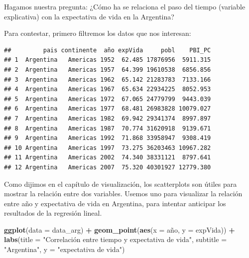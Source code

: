 \documentclass[spanish,]{book}
\newenvironment{Shaded}{\begin{snugshade}}{\end{snugshade}}
\newcommand{\DataTypeTok}[1]{\textcolor[rgb]{0.13,0.29,0.53}{#1}}
\newcommand{\KeywordTok}[1]{\textcolor[rgb]{0.13,0.29,0.53}{\textbf{#1}}}
\newcommand{\NormalTok}[1]{#1}
\newcommand{\OperatorTok}[1]{\textcolor[rgb]{0.81,0.36,0.00}{\textbf{#1}}}
\newcommand{\StringTok}[1]{\textcolor[rgb]{0.31,0.60,0.02}{#1}}
\begin{document}
Hagamos nuestra pregunta: ¿Cómo ha se relaciona el paso del tiempo (variable explicativa) con la expectativa de vida en la Argentina?

Para contestar, primero filtremos los datos que nos interesan:

\begin{Shaded}
\end{Shaded}

\begin{verbatim}
##         pais continente  año expVida     pobl    PBI_PC
## 1  Argentina   Americas 1952  62.485 17876956  5911.315
## 2  Argentina   Americas 1957  64.399 19610538  6856.856
## 3  Argentina   Americas 1962  65.142 21283783  7133.166
## 4  Argentina   Americas 1967  65.634 22934225  8052.953
## 5  Argentina   Americas 1972  67.065 24779799  9443.039
## 6  Argentina   Americas 1977  68.481 26983828 10079.027
## 7  Argentina   Americas 1982  69.942 29341374  8997.897
## 8  Argentina   Americas 1987  70.774 31620918  9139.671
## 9  Argentina   Americas 1992  71.868 33958947  9308.419
## 10 Argentina   Americas 1997  73.275 36203463 10967.282
## 11 Argentina   Americas 2002  74.340 38331121  8797.641
## 12 Argentina   Americas 2007  75.320 40301927 12779.380
\end{verbatim}

Como dijimos en el capítulo de visualización, los scatterplots son útiles para mostrar la relación entre dos variables. Usemos uno para visualizar la relación entre año y expectativa de vida en Argentina, para intentar anticipar los resultados de la regresión lineal.

\begin{Shaded}
\begin{Highlighting}[]
\KeywordTok{ggplot}\NormalTok{(}\DataTypeTok{data =}\NormalTok{ data_arg) }\OperatorTok{+}\StringTok{ }
\StringTok{    }\KeywordTok{geom_point}\NormalTok{(}\KeywordTok{aes}\NormalTok{(}\DataTypeTok{x =}\NormalTok{ año, }\DataTypeTok{y =}\NormalTok{ expVida)) }\OperatorTok{+}
\StringTok{    }\KeywordTok{labs}\NormalTok{(}\DataTypeTok{title =} \StringTok{"Correlación entre tiempo y expectativa de vida"}\NormalTok{,}
         \DataTypeTok{subtitle =} \StringTok{"Argentina"}\NormalTok{,}
         \DataTypeTok{y =} \StringTok{"expectativa de vida"}\NormalTok{)}
\end{Highlighting}
\end{Shaded}
\end{document}
